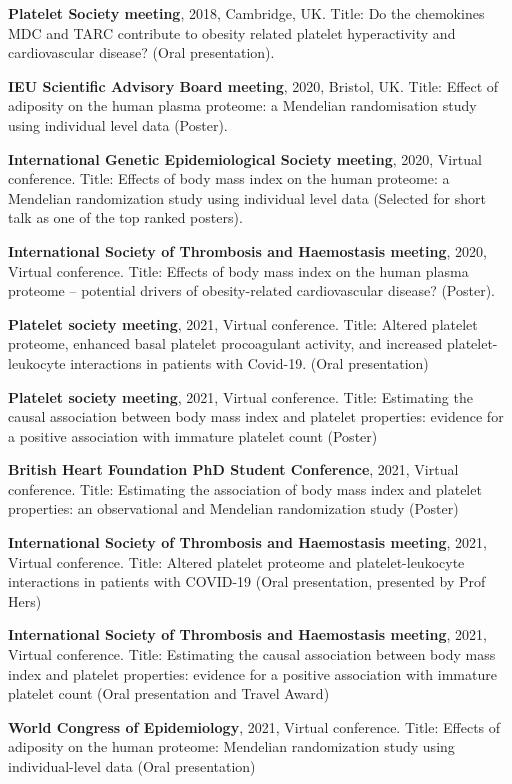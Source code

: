 \documentclass[11pt,twoside]{bristolthesis}
\begin{document}
\textbf{Platelet Society meeting}, 2018, Cambridge, UK. Title: Do the chemokines MDC and TARC contribute to obesity related platelet hyperactivity and cardiovascular disease? (Oral presentation).

\textbf{IEU Scientific Advisory Board meeting}, 2020, Bristol, UK. Title: Effect of adiposity on the human plasma proteome: a Mendelian randomisation study using individual level data (Poster).

\textbf{International Genetic Epidemiological Society meeting}, 2020, Virtual conference. Title: Effects of body mass index on the human proteome: a Mendelian randomization study using individual level data (Selected for short talk as one of the top ranked posters).

\textbf{International Society of Thrombosis and Haemostasis meeting}, 2020, Virtual conference. Title: Effects of body mass index on the human plasma proteome -- potential drivers of obesity-related cardiovascular disease? (Poster).

\textbf{Platelet society meeting}, 2021, Virtual conference. Title: Altered platelet proteome, enhanced basal platelet procoagulant activity, and increased platelet-leukocyte interactions in patients with Covid-19. (Oral presentation)

\textbf{Platelet society meeting}, 2021, Virtual conference. Title: Estimating the causal association between body mass index and platelet properties: evidence for a positive association with immature platelet count (Poster)

\textbf{British Heart Foundation PhD Student Conference}, 2021, Virtual conference. Title: Estimating the association of body mass index and platelet properties: an observational and Mendelian randomization study (Poster)

\textbf{International Society of Thrombosis and Haemostasis meeting}, 2021, Virtual conference. Title: Altered platelet proteome and platelet-leukocyte interactions in patients with COVID-19 (Oral presentation, presented by Prof Hers)

\textbf{International Society of Thrombosis and Haemostasis meeting}, 2021, Virtual conference. Title: Estimating the causal association between body mass index and platelet properties: evidence for a positive association with immature platelet count (Oral presentation and Travel Award)

\textbf{World Congress of Epidemiology}, 2021, Virtual conference. Title: Effects of adiposity on the human proteome: Mendelian randomization study using individual-level data (Oral presentation)
\end{document}
